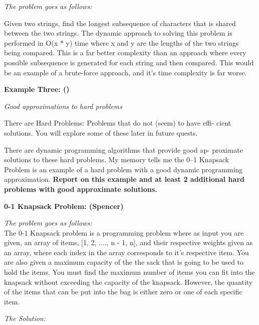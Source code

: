 \documentclass{article}
\begin{document}
\noindent \textit{The problem goes as follows:}

Given two strings, find the longest subsequence of characters that is 
shared between the two strings. The dynamic approach to solving this problem
is performed in O(x * y) time where x and y are the lengths of the two 
strings being compared. This is a far better complexity than an approach 
where every possible subsequence is generated for each string and then 
compared. This would be an example of a brute-force approach, and it's time 
complexity is far worse.

\bigskip

\noindent \textbf{Example Three: ()}




\pagebreak

\noindent \textit{Good approximations to hard problems}

\medskip

There are Hard Problems: Problems that do not (seem) to have effi-
cient solutions. You will explore some of these later in future quests.

\medskip

There are dynamic programming algorithms that provide good ap-
proximate solutions to these hard problems. My memory tells me the
0–1 Knapsack Problem is an example of a hard problem with a good
dynamic programming approximation. \textbf{Report on this example and
at least 2 additional hard problems with good approximate solutions.}

\bigskip

\noindent \textbf{0-1 Knapsack Problem: (Spencer)} 

\noindent \textit{The problem goes as follows:} \\

The 0-1 Knapsack problem is a programming problem where as input you
are given, an array of items, [1, 2, ...., n - 1, n], and their 
respective weights given as an array, where each index in the array
corresponds to it's respective item. You are also given a maximum capacity
of the the sack that is going to be used to hold the items. You must find
the maximum number of items you can fit into the knapsack without exceeding
the capacity of the knapsack. However, the quantity of the items that can
be put into the bag is either zero or one of each specific item.

\medskip

\noindent \textit{The Solution:} \\
\end{document}
